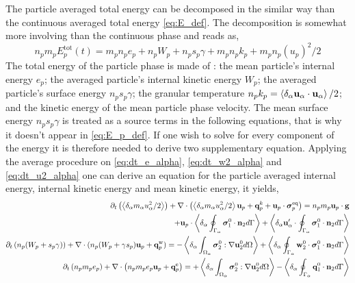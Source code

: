 The particle averaged total energy can be decomposed in the similar way than the continuous averaged total energy \ref{eq:E_def}. 
The decomposition is somewhat more involving than the continuous phase and reads as, 
\begin{equation*}
    n_p m_p E_p^\text{tot}(t) 
    = m_p n_p e_p 
    + n_p W_p
    + n_p s_p \gamma
    + m_p n_p k_p
    + m_p n_p (u_p)^2/2
    \label{eq:E_p_def}
\end{equation*}
The total energy of the particle phase is made of :
the mean particle's internal energy $e_p$; 
the averaged particle's internal kinetic energy $W_p$;
the averaged particle's surface energy $n_p s_p \gamma$;
the granular temperature $n_p k_p =\left<\delta_\alpha \textbf{u}_\alpha \cdot\textbf{u}_\alpha\right>/2$;
and the kinetic energy of the mean particle phase velocity. 
The mean surface energy $n_p s_p \gamma$ is treated as a source terms in the following equations, that is why it doesn't appear in \ref{eq:E_p_def}.  
If one wish to solve for every component of the energy it is therefore needed to derive two supplementary equation. 
Applying the average procedure on \ref{eq:dt_e_alpha}, \ref{eq:dt_w2_alpha} and \ref{eq:dt_u2_alpha} one can derive an equation for the particle averaged internal energy, internal kinetic energy and mean kinetic energy, it yields, 
\begin{align}
    \label{eq:dt_hybrid_u2p}
    \partial_t \left(\left<\delta_\alpha m_\alpha u_\alpha^2/2\right>\right)
    + \mathbf{\nabla}\cdot \left(\left<\delta_\alpha m_\alpha u_\alpha^2/2\right> \textbf{u}_p 
    + \textbf{q}^k_p
    + \textbf{u}_p \cdot \bm{\sigma}_p^\text{eq}
    \right)
    = 
    n_p m_p \textbf{u}_p \cdot
    \textbf{g}\nonumber\\  
    + \textbf{u}_p\cdot\left<\delta_\alpha \oint_{\Gamma_\alpha} {\bm{\sigma}_1^0 \cdot \textbf{n}_2} d\Gamma\right>
    + \left<\delta_\alpha \textbf{u}_\alpha'\cdot\oint_{\Gamma_\alpha} \bm{\sigma}_1^0 \cdot \textbf{n}_2 d\Gamma\right>
    \\
    \label{eq:dt_hybrid_Wp}
    \partial_t \left(n_p (W_p + s_p\gamma)\right)
    + \mathbf{\nabla}\cdot 
    (n_p (W_p + \gamma s_p)
    \textbf{u}_p 
    +  \textbf{q}_p^\text{w}
    )
    = 
    - \left<\delta_\alpha \int_{\Omega_\alpha} {\bm{\sigma}_2^0 : \mathbf{\nabla}\textbf{u}_2^0} d\Omega\right>
    + \left<\delta_\alpha \oint_{\Gamma_\alpha} {\textbf{w}_2^0 \cdot \bm{\sigma}_1^0 \cdot  \textbf{n}_2} d\Gamma\right>
    \\
    \partial_t \left(n_p m_p e_p\right)
    + \mathbf{\nabla}\cdot \left(n_p
    m_p e_p \textbf{u}_p 
    +  \textbf{q}_p^\text{e}
    \right)
    = 
    + \left<\delta_\alpha \int_{\Omega_\alpha} {\bm{\sigma}_2^0 : \mathbf{\nabla}\textbf{u}_2^0} d\Omega\right>
    - \left<\delta_\alpha \oint_{\Gamma_\alpha} {\textbf{q}_1^0\cdot \textbf{n}_2} d\Gamma\right>
    \label{eq:dt_hybrid_ep}
\end{align}
